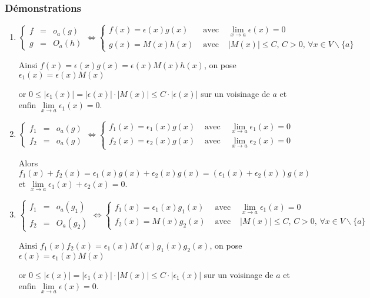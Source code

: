 \documentclass[a4paper,10pt]{book} %
\begin{document}
\subsubsection{Démonstrations}
\begin{enumerate}
\item $\left\{\begin{array}{rcl} f&=& o_a(g) \\ g&=& O_a(h)\end{array} \right. 
\Leftrightarrow \left\{\begin{array}{rcl} f(x)=\epsilon(x)g(x)&\text{ avec }&\lim\limits_{x\rightarrow a}\epsilon(x)=0 \\ g(x)=M(x)h(x)&\text{ avec }&|M(x)|\leq C\text{, }C>0\text{, }\forall x\in V\backslash\{a\}\end{array}\right.$

Ainsi $f(x)=\epsilon(x) g(x)=\epsilon(x)M(x)h(x)$, on pose $\epsilon_1(x)=\epsilon(x)M(x)$

or $0\leq |\epsilon_1(x)|=|\epsilon(x)|\cdot |M(x)| \leq C\cdot |\epsilon(x)|$ sur un voisinage de $a$ et enfin $\lim\limits_{x\rightarrow a}\epsilon_1(x)=0$. 

\bigskip

\item $\left\{\begin{array}{rcl} f_1&=& o_a(g) \\ f_2&=& o_a(g)\end{array} \right. 
\Leftrightarrow \left\{\begin{array}{rcl} f_1(x)=\epsilon_1(x)g(x)&\text{ avec }&\lim\limits_{x\rightarrow a}\epsilon_1(x)=0 \\ f_2(x)=\epsilon_2(x)g(x)&\text{ avec }&\lim\limits_{x\rightarrow a}\epsilon_2(x)=0\end{array}\right.$

Alors $f_1(x)+f_2(x)=\epsilon_1(x)g(x)+\epsilon_2(x)g(x)=(\epsilon_1(x)+\epsilon_2(x))g(x)$ et $\lim\limits_{x\rightarrow a}\epsilon_1(x)+\epsilon_2(x)=0$. 

\bigskip

\item $\left\{\begin{array}{rcl} f_1&=& o_a(g_1) \\ f_2&=& O_a(g_2)\end{array} \right. 
\Leftrightarrow \left\{\begin{array}{rcl} f_1(x)=\epsilon_1(x)g_1(x)&\text{ avec }&\lim\limits_{x\rightarrow a}\epsilon_1(x)=0 \\ f_2(x)=M(x)g_2(x)&\text{ avec }&|M(x)|\leq C\text{, }C>0\text{, }\forall x\in V\backslash\{a\}\end{array}\right.$

Ainsi $f_1(x)f_2(x)=\epsilon_1(x)M(x)g_1(x)g_2(x)$, on pose $\epsilon(x)=\epsilon_1(x)M(x)$

or $0\leq |\epsilon(x)|=|\epsilon_1(x)|\cdot |M(x)| \leq C\cdot |\epsilon_1(x)|$ sur un voisinage de $a$ et enfin $\lim\limits_{x\rightarrow a}\epsilon(x)=0$.
\end{enumerate}
\end{document}
